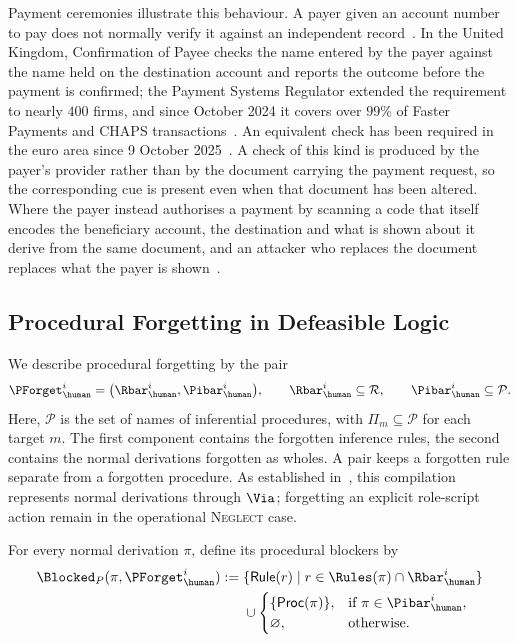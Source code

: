 Payment ceremonies illustrate this behaviour. A payer given an account number to pay does not normally verify it against an independent record~\cite{drimer2009optimised}. In the United Kingdom, Confirmation of Payee checks the name entered by the payer against the name held on the destination account and reports the outcome before the payment is confirmed; the Payment Systems Regulator extended the requirement to nearly $400$ firms, and since October 2024 it covers over $99\%$ of Faster Payments and CHAPS transactions~\cite{psrcop2024}. An equivalent check has been required in the euro area since 9 October 2025~\cite{ipr2024}. A check of this kind is produced by the payer's provider rather than by the document carrying the payment request, so the corresponding cue is present even when that document has been altered. Where the payer instead authorises a payment by scanning a code that itself encodes the beneficiary account, the destination and what is shown about it derive from the same document, and an attacker who replaces the document replaces what the payer is shown~\cite{vidas2013qrishing,kharraz2014optical}.

\subsection{Procedural Forgetting in Defeasible Logic}
\label{Subsec:ProceduralDefeasible}

We describe procedural forgetting by the pair
\[
    \PForget_{\human}^{i} =\bigl(\Rbar_{\human}^{i},\Pibar_{\human}^{i}\bigr), \qquad \Rbar_{\human}^{i}\subseteq\mathcal R, \qquad \Pibar_{\human}^{i}\subseteq\mathcal P. 
\]
Here, $\mathcal P$ is the set of names of inferential procedures, with $\Pi_m\subseteq\mathcal P$ for each target $m$. The first component contains the forgotten inference rules, the second contains the normal derivations forgotten as wholes. A pair keeps a forgotten rule separate from a forgotten procedure. As established in~, this compilation represents normal derivations through $\Via$; forgetting an explicit role-script action remain in the operational \textsc{Neglect} case.

For every normal derivation $\pi$, define its procedural blockers by
\begin{equation}
\label{Eq:ProceduralBlocked}
\begin{split}
\Blocked_{P}(\pi,\PForget_{\human}^{i}) := {}& \{\mathsf{Rule}(r) \mid r\in\Rules(\pi) \cap\Rbar_{\human}^{i}\}\\
     &{}\cup 
     \begin{cases}
       \{\mathsf{Proc}(\pi)\},
       & \text{if }\pi\in\Pibar_{\human}^{i},\\
       \varnothing,&\text{otherwise.}
     \end{cases}
\end{split}
\end{equation}

